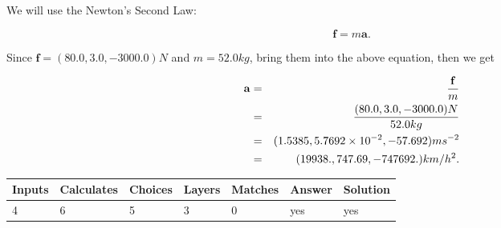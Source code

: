 \documentclass[12pt]{article}
\begin{document}
 
\noindent{}
 
 

We will use the Newton's Second Law:
 
\[
\mathbf{f}=m\mathbf{a}.
\]
 
Since $\mathbf{f}=( %
80.0,  %
3.0,  %
-3000.0 )N$
and $m= %
52.0kg$, bring them into the above equation, then we get
 
\begin{eqnarray*}
\mathbf{a}&=&\frac{\mathbf{f}}m  \\
&=&\frac{(
80.0 ,
3.0 ,
-3000.0 )N
}{ %
52.0 kg}  \\
&=&(
1.5385 ,
5.7692 \times 10^{-2},
-57.692
)ms^{-2} \\
&=&(
19938. ,
747.69 ,
-747692.
)km/h^2.
\end{eqnarray*}
 
 
 
\noindent{}
 
 

 
\vspace{0.3in}
   
   
   
   
\noindent\begin{tabular}{|l|l|l|l|l|l|l|}
 \hline
Inputs & Calculates & Choices & Layers & Matches & Answer & Solution \\ \hline
           4  & 
           6  & 
           5
  & 
           3  & 
           0  & 
  yes & 
  yes 
  \\ \hline
 \end{tabular}
   
   
   
   
\noindent{}
   
   
  
\end{document}
